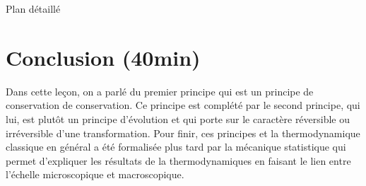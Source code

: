 \begin{reportBlock}{Plan détaillé}
  \section*{Conclusion (40min)}
  Dans cette leçon, on a parlé du premier principe qui est un principe de conservation de conservation. Ce principe est complété par le second principe, qui lui, est plutôt un principe d'évolution et qui porte sur le caractère réversible ou irréversible d'une transformation. Pour finir, ces principes et la thermodynamique classique en général a été formalisée plus tard par la mécanique statistique qui permet d'expliquer les résultats de la thermodynamiques en faisant le lien entre l'échelle microscopique et macroscopique.



\end{reportBlock}



